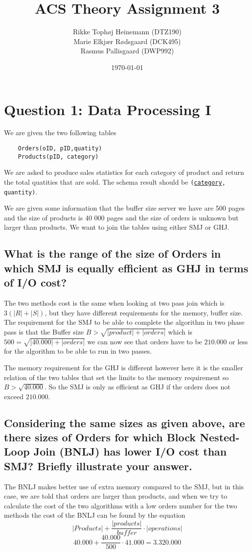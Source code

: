\documentclass{article}
\title{ACS Theory Assignment 3}
\author{Rikke Tophøj Heinemann (DTZ190) \\ Marie Elkjær Rødsgaard (DCK495) \\ Rasmus Pallisgaard (DWP992)}
\date{\today}
\begin{document}
\maketitle
\section{Question 1: Data Processing I}
We are given the two following tables 
\begin{verbatim}
    Orders(oID, pID,quatity) 
    Products(pID, category) 
\end{verbatim}
We are asked to produce sales statistics for each category of product and return the total quatities that are sold. The schema result should be \texttt{(\underline{category}, quantity)}.

We are given some information that the buffer size server we have are 500 pages and the size of products is 40 000 pages and the size of orders is unknown but larger than products. We want to join the tables using either SMJ or GHJ.

\subsection{What is the range of the size of Orders in which SMJ is equally efficient as GHJ in terms of I/O cost?}
The two methods cost is the same when looking at two pass join which is $3(|R|+|S|)$, but they have different requirements for the memory, buffer size. The requirement for the SMJ to be able to complete the algorithm in two phase pass is that the Buffer size $B > \sqrt{|product| + |orders|}$ which is $500= \sqrt{|40.000| + |orders|}$ we can now see that orders have to be $210.000$ or less for the algorithm to be able to run in two passes. 

The memory requirement for the GHJ is different however here it is the smaller relation of the two tables that set the limits to the memory requirement so $B > \sqrt{40.000}$. So the SMJ is only as efficient as GHJ if the orders does not exceed $210.000$. 

\subsection{Considering the same sizes as given above, are there sizes of Orders for which Block Nested-Loop Join (BNLJ) has lower I/O cost than SMJ? Briefly illustrate your answer.}
The BNLJ makes better use of extra memory compared to the SMJ, but in this case, we are told that orders are larger than products, and when we try to calculate the cost of the two algorithms with a low orders number for the two methods the cost of the BNLJ can be found by the equation 
$$|Products| + \frac{|products|}{buffer} \cdot |operations| $$
$$40.000 + \frac{40.000}{500} \cdot 41.000 = 3.320.000 $$
\end{document}
